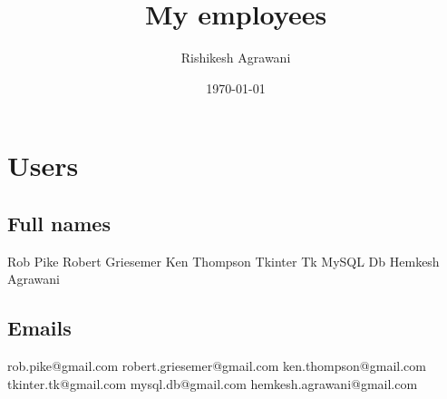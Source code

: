 \documentclass{article}%
\title{My employees}%
\author{Rishikesh Agrawani}%
\date{\today}%
\begin{document}
%
\normalsize%
\maketitle%
\section{Users}%
\subsection{Full names}%
Rob Pike\newline%
%
Robert Griesemer\newline%
%
Ken Thompson\newline%
%
Tkinter Tk\newline%
%
MySQL Db\newline%
%
Hemkesh Agrawani\newline%

%
\subsection{Emails}%
rob.pike@gmail.com\newline%
%
robert.griesemer@gmail.com\newline%
%
ken.thompson@gmail.com\newline%
%
tkinter.tk@gmail.com\newline%
%
mysql.db@gmail.com\newline%
%
hemkesh.agrawani@gmail.com\newline%

%
\end{document}
